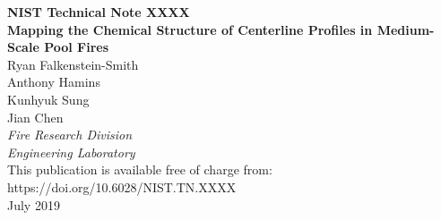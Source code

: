\documentclass[12pt]{article}
\newcommand{\pubnumber}{XXXX}
\newcommand{\DOI}{https://doi.org/10.6028/NIST.TN.XXXX}
\newcommand{\monthyear}{July 2019}
\begin{document}
\begin{titlepage}
\begin{flushright}
\LARGE{\textbf{NIST Technical Note \pubnumber}}\\
\vfill 
\Huge{\textbf{Mapping the Chemical Structure of Centerline Profiles in Medium-Scale Pool Fires}}\\
\vfill
\normalsize Ryan Falkenstein-Smith\\
Anthony Hamins\\
Kunhyuk Sung\\
Jian Chen\\
\large
\textit{Fire Research Division}\\
\textit{Engineering Laboratory}\\
\vspace{12pt}
\vfill
\normalsize This publication is available free of charge from:\\
\DOI\\
\vfill
\normalsize \monthyear
\vfill


\end{flushright}
\end{titlepage}
\end{document}
